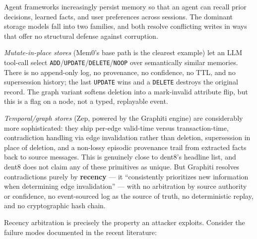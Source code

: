 \documentclass[11pt]{article}
\newcommand{\code}[1]{\texttt{#1}}
\begin{document}
Agent frameworks increasingly persist memory so that an agent can recall prior decisions, learned facts, and user preferences across sessions. The dominant storage models fall into two families, and both resolve conflicting writes in ways that offer no structural defense against corruption.

\emph{Mutate-in-place stores} (Mem0's base path is the clearest example) let an LLM tool-call select \code{ADD}/\code{UPDATE}/\code{DELETE}/\code{NOOP} over semantically similar memories. There is no append-only log, no provenance, no confidence, no TTL, and no supersession history; the last \code{UPDATE} wins and a \code{DELETE} destroys the original record. The graph variant softens deletion into a mark-invalid attribute flip, but this is a flag on a node, not a typed, replayable event.

\emph{Temporal/graph stores} (Zep, powered by the Graphiti engine) are considerably more sophisticated: they ship per-edge valid-time versus transaction-time, contradiction handling via edge invalidation rather than deletion, supersession in place of deletion, and a non-lossy episodic provenance trail from extracted facts back to source messages. This is genuinely close to dent8's headline list, and dent8 does not claim any of these primitives as unique. But Graphiti resolves contradictions purely by \textbf{recency} --- it ``consistently prioritizes new information when determining edge invalidation'' --- with no arbitration by source authority or confidence, no event-sourced log as the source of truth, no deterministic replay, and no cryptographic hash chain.

Recency arbitration is precisely the property an attacker exploits. Consider the failure modes documented in the recent literature:
\end{document}
